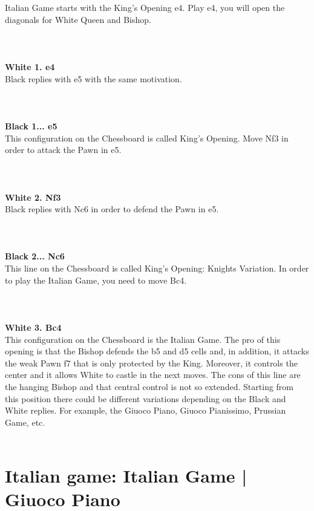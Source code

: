 \documentclass{article}
\begin{document}
Italian Game starts with the King's Opening e4. Play e4, you will open the diagonals for White Queen and Bishop.\\
\\

\\
\\
\textbf{White 1. e4}\\
Black replies with e5 with the same motivation.\\
\\

\\
\\
\textbf{Black 1... e5}\\
This configuration on the Chessboard is called King's Opening. Move Nf3 in order to attack the Pawn in e5.\\
\\

\\
\\
\textbf{White 2. Nf3}\\
Black replies with Nc6 in order to defend the Pawn in e5.\\
\\

\\
\\
\textbf{Black 2... Nc6}\\
This line on the Chessboard is called King's Opening: Knights Variation. In order to play the Italian Game, you need to move Bc4.\\
\\

\\
\\
\textbf{White 3. Bc4}\\
This configuration on the Chessboard is the Italian Game.
The pro of this opening is that the Bishop defends the b5 and d5 cells and, in addition, it attacks the weak Pawn f7 that is only protected by the King. Moreover, it controls the center and it allows White to castle in the next moves.
The cons of this line are the hanging Bishop and that central control is not so extended.
Starting from this position there could be different variations depending on the Black and White replies. For example, the Giuoco Piano, Giuoco Pianissimo, Prussian Game, etc.\\
\\
\section{Italian game: Italian Game | Giuoco Piano}
\end{document}
